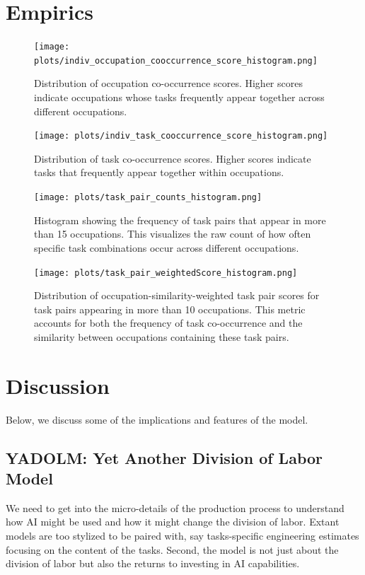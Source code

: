 \documentclass{article}
\begin{document}
\section{Empirics}

\begin{figure}[htbp]
  \centering
  \texttt{[image: plots/indiv\_occupation\_cooccurrence\_score\_histogram.png]}
  \caption{Distribution of occupation co-occurrence scores. Higher scores indicate occupations whose tasks frequently appear together across different occupations.}
  \label{fig:occ_cooc}
\end{figure}

\begin{figure}[htbp]
  \centering
  \texttt{[image: plots/indiv\_task\_cooccurrence\_score\_histogram.png]}
  \caption{Distribution of task co-occurrence scores. Higher scores indicate tasks that frequently appear together within occupations.}
  \label{fig:task_cooc}
\end{figure}

\begin{figure}[htbp]
  \centering
  \texttt{[image: plots/task\_pair\_counts\_histogram.png]}
  \caption{Histogram showing the frequency of task pairs that appear in more than 15 occupations. This visualizes the raw count of how often specific task combinations occur across different occupations.}
  \label{fig:pair_counts}
\end{figure}

\begin{figure}[htbp]
  \centering
  \texttt{[image: plots/task\_pair\_weightedScore\_histogram.png]}
  \caption{Distribution of occupation-similarity-weighted task pair scores for task pairs appearing in more than 10 occupations. This metric accounts for both the frequency of task co-occurrence and the similarity between occupations containing these task pairs.}
  \label{fig:weighted_pairs}
\end{figure}

\section{Discussion}
Below, we discuss some of the implications and features of the model. 

\subsection{YADOLM: Yet Another Division of Labor Model}
We need to get into the micro-details of the production process to understand how AI might be used and how it might change the division of labor. 
Extant models are too stylized to be paired with, say tasks-specific engineering estimates focusing on the content of the tasks.
Second, the model is not just about the division of labor but also the returns to investing in AI capabilities.
\end{document}
